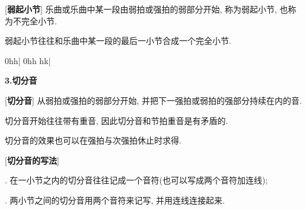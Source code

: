 [\textbf{弱起小节}] 乐曲或乐曲中某一段由弱拍或强拍的弱部分开始, 称为弱起小节, 也称为不完全小节.\par
\qquad 弱起小节往往和乐曲中某一段的最后一小节合成一个完全小节.\par
\startextract
\Notes \islurd 0h\ha h\en\bar
\Notes \tslur 0h\qa h \Dqbl hk\en\setdoublebar\bar
\zendextract

\clearpage

\begin{center}
 \textbf{3.切分音}\\
\end{center}

[\textbf{切分音}] 从弱拍或强拍的弱部分开始, 并把下一强拍或弱拍的强部分持续在内的音.\par
\qquad 切分音开始往往带有重音, 因此切分音和节拍重音是有矛盾的.\par
\qquad 切分音的效果也可以在强拍与次强拍休止时求得.\par

[\textbf{切分音的写法}] \par
{}. 在一小节之内的切分音往往记成一个音符(也可以写成两个音符加连线);\par
{}. 两小节之间的切分音用两个音符来记写, 并用连线连接起来.\par


